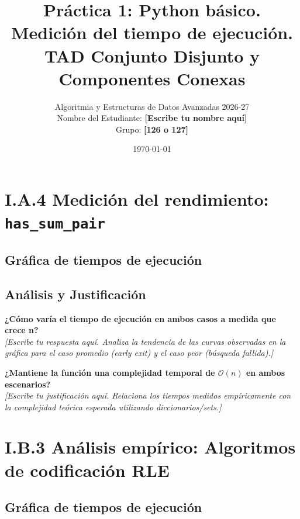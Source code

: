 \documentclass[11pt, a4paper]{article}
\title{\textbf{Práctica 1: Python básico. Medición del tiempo de ejecución. TAD Conjunto Disjunto y Componentes Conexas}}
\author{
    Algoritmia y Estructuras de Datos Avanzadas 2026-27 \\
    Nombre del Estudiante: \textbf{[Escribe tu nombre aquí]} \\
    Grupo: \textbf{[126 o 127]}
}
\date{\today}
\begin{document}
\maketitle

\section{I.A.4 Medición del rendimiento: \texttt{has\_sum\_pair}}

\subsection*{Gráfica de tiempos de ejecución}

\begin{center}
\end{center}

\subsection*{Análisis y Justificación}

\textbf{¿Cómo varía el tiempo de ejecución en ambos casos a medida que crece n?} \\
\textit{[Escribe tu respuesta aquí. Analiza la tendencia de las curvas observadas en la gráfica para el caso promedio (early exit) y el caso peor (búsqueda fallida).]}

\vspace{1em}

\textbf{¿Mantiene la función una complejidad temporal de \(\mathcal{O}(n)\) en ambos escenarios?} \\
\textit{[Escribe tu justificación aquí. Relaciona los tiempos medidos empíricamente con la complejidad teórica esperada utilizando diccionarios/sets.]}


\newpage
\section{I.B.3 Análisis empírico: Algoritmos de codificación RLE}

\subsection*{Gráfica de tiempos de ejecución}
\end{document}
